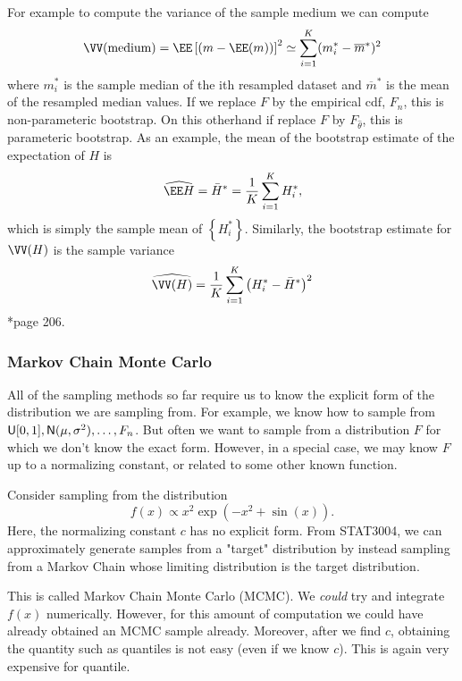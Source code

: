 For example to compute the variance of the sample medium we can compute
\begin{equation*}
    \VV (\text{medium}) = \EE \left[ (m - \EE(m)) \right]^2 \simeq \sum_{i=1}^{K} (m_i^{\ast} - \overline{m}^{\ast})^2
\end{equation*}
where $m_i^{\ast}$ is the sample median of the ith resampled dataset and $\overline{m}^{\ast}$ is the mean of the resampled median values. If we replace $F$ by the empirical cdf, $F_n$, this is non-parameteric bootstrap. On this otherhand if replace $F$ by $F_{\hat{\theta}}$, this is parameteric bootstrap. As an example, the mean of the bootstrap estimate of the expectation of $H$ is
\[
    \widehat{\EE H} = \bar{H}^{\ast} = \frac{1}{K} \sum_{i=1}^{K} H_i^{\ast},
\]
which is simply the sample mean of $\left\{ H_i^{\ast} \right\}$. Similarly, the bootstrap estimate for $\VV (H)$ is the sample variance
\[
    \widehat{\VV (H)} = \frac{1}{K} \sum_{i=1}^{K} \left( H_i^{\ast} - \bar{H}^{\ast} \right)^2
\]
\cite{KroeseDirkP2013SMaC}*{page 206}.

\subsubsection*{Markov Chain Monte Carlo}

All of the sampling methods so far require us to know the explicit form of the distribution we are sampling from. For example, we know how to sample from ${\sf U} [0,1], {\sf N} (\mu , \sigma^2), \ldots , F_n$. But often we want to sample from a distribution $F$ for which we don't know the exact form. However, in a special case, we may know $F$ up to a normalizing constant, or related to some other known function.

\begin{exam} \label{exam: mcmc_intro}
    Consider sampling from the distribution
    \begin{equation*}
        f (x) \propto x^2 \exp \left( -x^2 + \sin (x) \right).
    \end{equation*}
    Here, the normalizing constant $c$ has no explicit form. From STAT3004, we can approximately generate samples from a "target" distribution by instead sampling from a Markov Chain whose limiting distribution is the target distribution.
\end{exam}

This is called Markov Chain Monte Carlo (MCMC). We {\it could} try and integrate $f(x)$ numerically. However, for this amount of computation we could have already obtained an MCMC sample already. Moreover, after we find $c$, obtaining the quantity such as quantiles is not easy (even if we know $c$). This is again very expensive for quantile.

